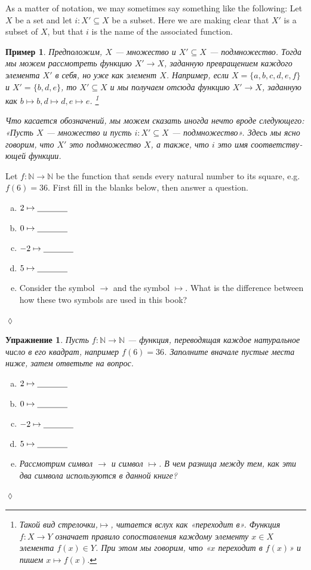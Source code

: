 \documentclass[a4paper]{book}
\def\NN{{\mathbb N}}
\def\to{\rightarrow}
\def\taking{\colon}
\def\ss{\subseteq}
\def\ul{\underline}
\theoremstyle{myth}
\newtheorem{exampleENG}[envENG]{\begin{english}Example\end{english}}
\newtheorem{excENG}[envENG]{\begin{english}Exercise\end{english}}
\newenvironment{exerciseENG}{\begin{excENG}}{\hspace*{\fill}$\lozenge$\end{excENG}}
\newtheorem{exampleRUS}[envRUS]{Пример}
\newtheorem{excRUS}[envRUS]{Упражнение}
\newenvironment{exerciseRUS}{\begin{excRUS}}{\hspace*{\fill}$\lozenge$\end{excRUS}}
\def\sexc{\begin{enumerate}[a.)]\setlength{\itemsep}{.1cm}\setlength{\parskip}{.1cm}\item}
\def\next{\item}
\def\endsexc{\end{enumerate}}
\begin{document}
\begin{russian}
\begin{exampleENG}
As a matter of notation, we may sometimes say something like the following: Let $X$ be a set and let $i\taking X'\ss X$ be a subset. Here we are making clear that $X'$ is a subset of $X$, but that $i$ is the name of the associated function.
\end{exampleENG}

\begin{exampleRUS}\label{ex:subset as function}
Предположим, $X$ — множество и $X'\ss X$ — подмножество. Тогда мы можем рассмотреть функцию $X'\to X$, заданную превращением каждого элемента $X'$ в себя, но уже как элемент $X$. Например, если $X=\{a,b,c,d,e,f\}$ и $X'=\{b,d,e\}$, то $X'\ss X$ и мы получаем отсюда функцию $X'\to X$, заданную как $b\mapsto b, d\mapsto d, e\mapsto e$.%
\footnote{Такой вид стрелочки,\;\;$\mapsto$\;\;, читается вслух как «переходит в». Функция $f\taking X\to Y$ означает правило сопоставления каждому элементу $x\in X$ элемента $f(x)\in Y$. При этом мы говорим, что «$x$ переходит в $f(x)$» и пишем $x\mapsto f(x)$.}

Что касается обозначений, мы можем сказать иногда нечто вроде следующего: «Пусть $X$ — множество и пусть $i\taking X'\ss X$ — подмножество». Здесь мы ясно говорим, что $X'$ это подмножество $X$, а также, что $i$ это имя соответствующей функции.
\end{exampleRUS}

\begin{exerciseENG}
Let $f\taking\NN\to\NN$ be the function that sends every natural number to its square, e.g. $f(6)=36$. First fill in the blanks below, then answer a question.
\sexc $2\mapsto\ul{\hspace{.5in}}$
\next $0\mapsto\ul{\hspace{.5in}}$
\next $-2\mapsto\ul{\hspace{.5in}}$
\next $5\mapsto\ul{\hspace{.5in}}$
\next Consider the symbol $\to$ and the symbol $\mapsto$. What is the difference between how these two symbols are used in this book?
\endsexc
\end{exerciseENG}

\begin{exerciseRUS}
Пусть $f\taking\NN\to\NN$ — функция, переводящая каждое натуральное число в его квадрат, например $f(6)=36$. Заполните вначале пустые места ниже, затем ответьте на вопрос.
\sexc $2\mapsto\ul{\hspace{.5in}}$
\next $0\mapsto\ul{\hspace{.5in}}$
\next $-2\mapsto\ul{\hspace{.5in}}$
\next $5\mapsto\ul{\hspace{.5in}}$
\next Рассмотрим символ $\to$ и символ $\mapsto$. В чем разница между тем, как эти два символа используются в данной книге?
\endsexc
\end{exerciseRUS}


\end{russian}
\end{document}

